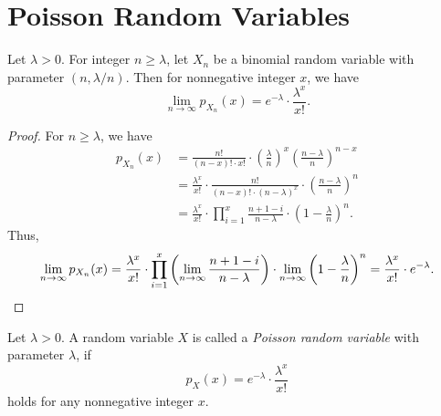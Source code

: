 \section{Poisson Random Variables}
\begin{theorem}
  Let $\lambda > 0$.
  For integer $n \geq \lambda$, let $X_n$ be a binomial random variable with
  parameter $(n, \lambda/n)$. Then for nonnegative integer $x$, we have
  \begin{equation*}
    \lim_{n \to \infty}p_{X_n}(x) = e^{-\lambda} \cdot \frac{\lambda^x}{x!}.
  \end{equation*}
\end{theorem}
\begin{proof}
  For $n \geq \lambda$, we have
  \begin{align*}
    p_{X_n}(x)
    &= \frac{n!}{(n-x)! \cdot x!} \cdot \left(\frac{\lambda}{n}\right)^x \left(\frac{n-\lambda}{n}\right)^{n-x} \\
    &= \frac{\lambda^x}{x!} \cdot \frac{n!}{(n-x)! \cdot (n-\lambda)^x} \cdot \left(\frac{n-\lambda}{n}\right)^n \\
    &= \frac{\lambda^x}{x!} \cdot \prod_{i=1}^{x} \frac{n+1-i}{n-\lambda} \cdot \left(1 - \frac{\lambda}{n}\right)^n.
  \end{align*}
  Thus,
  \begin{equation*}
    \lim_{n\to\infty} p_{X_n}(x)
    = \frac{\lambda^x}{x!} \cdot \prod_{i=1}^x \left(\lim_{n\to\infty} \frac{n+1-i}{n-\lambda}\right) \cdot \lim_{n\to\infty}\left(1 - \frac{\lambda}{n}\right)^n
    = \frac{\lambda^x}{x!} \cdot e^{-\lambda}. \qedhere
  \end{equation*}
\end{proof}

\begin{definition}
  Let $\lambda > 0$.
  A random variable $X$ is called a \emph{Poisson random variable} with
  parameter $\lambda$, if
  \begin{equation*}
    p_X(x) = e^{-\lambda} \cdot \frac{\lambda^x}{x!}
  \end{equation*}
  holds for any nonnegative integer $x$.
\end{definition}

